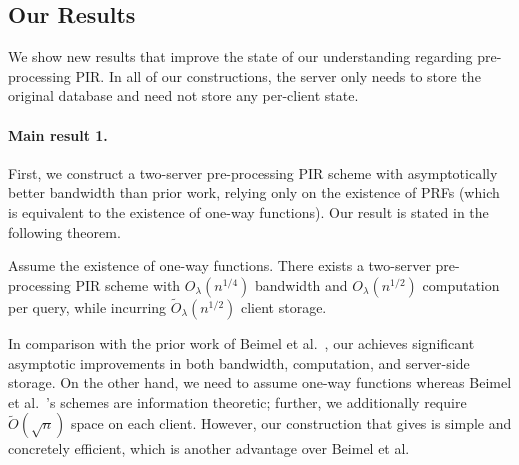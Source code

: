 

\subsection{Our Results}

We show new results that improve the %
state of our understanding regarding pre-processing PIR. 
In all of our constructions, the server only needs to store
the original database and need not store any per-client state. 



\paragraph{Main result 1.}
First, we construct a two-server pre-processing  
PIR scheme with asymptotically better bandwidth than prior work, relying only on the  
existence of PRFs (which is equivalent to the existence of one-way functions). 
Our result is stated in the following theorem. 

\begin{theorem}
Assume the existence of one-way functions. 
There exists a two-server pre-processing PIR scheme 
with ${O}_\lambda(n^{1/4})$
bandwidth and ${O}_\lambda(n^{1/2})$
computation per query, while incurring
$\widetilde{O}_\lambda(n^{1/2})$ 
client storage. 
\label{thm:intro-2server}
\end{theorem}
In comparison with the prior work of Beimel et al.~\cite{bim-pir}, 
our 
achieves significant asymptotic improvements 
in both bandwidth, computation, and server-side storage.
On the other hand, we need to assume one-way functions
whereas Beimel et al.~\cite{bim-pir}'s schemes are information theoretic; further,
we additionally require $\widetilde{O}(\sqrt{n})$ 
space on each client.
However, our construction that gives  
is simple and concretely efficient, which is another advantage 
over Beimel et al. %

